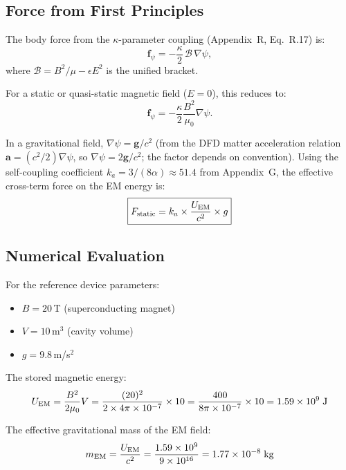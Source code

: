 \documentclass[12pt,letterpaper]{article}
\begin{document}
\subsection{Force from First Principles}

The body force from the $\kappa$-parameter coupling (Appendix~R, Eq.~R.17) is:
\begin{equation}
\mathbf{f}_\psi = -\frac{\kappa}{2}\,\mathcal{B}\,\nabla\psi,
\end{equation}
where $\mathcal{B} = B^2/\mu - \epsilon E^2$ is the unified bracket.

For a static or quasi-static magnetic field ($E = 0$), this reduces to:
\begin{equation}
\mathbf{f}_\psi = -\frac{\kappa}{2}\frac{B^2}{\mu_0}\nabla\psi.
\end{equation}

In a gravitational field, $\nabla\psi = \mathbf{g}/c^2$ (from the DFD matter
acceleration relation $\mathbf{a} = (c^2/2)\nabla\psi$, so $\nabla\psi = 2\mathbf{g}/c^2$;
the factor depends on convention). Using the self-coupling coefficient
$k_a = 3/(8\alpha) \approx 51.4$ from Appendix~G, the effective cross-term
force on the EM energy is:
\begin{equation}
\boxed{F_{\rm static} = k_a \times \frac{U_{\rm EM}}{c^2} \times g}
\label{eq:static-force}
\end{equation}

\subsection{Numerical Evaluation}

For the reference device parameters:
\begin{itemize}
\item $B = 20$\,T (superconducting magnet)
\item $V = 10$\,m$^3$ (cavity volume)
\item $g = 9.8$\,m/s$^2$
\end{itemize}

The stored magnetic energy:
\begin{equation}
U_{\rm EM} = \frac{B^2}{2\mu_0}V = \frac{(20)^2}{2 \times 4\pi \times 10^{-7}} \times 10
= \frac{400}{8\pi \times 10^{-7}} \times 10 = 1.59 \times 10^9\;\text{J}
\end{equation}

The effective gravitational mass of the EM field:
\begin{equation}
m_{\rm EM} = \frac{U_{\rm EM}}{c^2} = \frac{1.59 \times 10^9}{9 \times 10^{16}} = 1.77 \times 10^{-8}\;\text{kg}
\end{equation}
\end{document}

